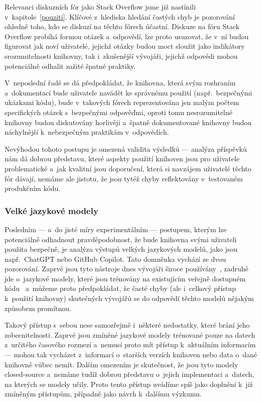 Relevanci diskuzních fór jako Stack Overflow jsme již nastínili v~kapitole~\ref{pouziti}. Klíčové z~hlediska hledání častých chyb je pozorování ohledně toho, kdo se diskuzí na těchto fórech účastní. Diskuze na fóru Stack Overflow probíhá formou otázek a~odpovědí, lze proto usuzovat, že v~ní budou figurovat jak noví uživatelé, jejichž otázky budou moct sloužit jako indikátory srozumitelnosti knihovny, tak i~zkušenější vývojáři, jejichž odpovědi mohou potenciálně odhalit zažité špatné praktiky.

V~neposlední řadě se dá předpokládat, že knihovna, která svým rozhraním a~dokumentací bude uživatele navádět ke správnému použití (např.\ bezpečnými ukázkami kódu), bude v~takových fórech reprezentována jen malým počtem specifických otázek s~bezpečnými odpověďmi, oproti tomu nesrozumitelné knihovny budou diskutovány horlivěji a~špatně dokumentované knihovny budou náchylnější k~nebezpečným praktikám v~odpovědích.

Nevýhodou tohoto postupu je omezená validita výsledků --- analýza příspěvků nám dá dobrou představu, které aspekty použití knihoven jsou pro uživatele problematické a~jak kvalitní jsou doporučení, která si navzájem uživatelé těchto fór dávají, nemáme ale jistotu, že jsou tytéž chyby reflektovány v~testovaném produkčním kódu.

\subsubsection*{Velké jazykové modely}

Posledním --- a~do jisté míry experimentálním --- postupem, kterým lze potenciálně odhadnout pravděpodobnost, že bude knihovna svými uživateli použita bezpečně, je analýza výstupů velkých jazykových modelů, jako jsou např.\ ChatGPT nebo GitHub Copilot. Tato domněnka vychází ze dvou pozorování. Zaprvé jsou tyto nástroje dnes vývojáři široce používány~\cite{ai-hallucinate, github-copilot}, zadruhé jde o~jazykové modely, které jsou trénovány na existujícím veřejně dostupném kódu~\cite{github-copilot} a~můžeme proto předpokládat, že časté chyby (ale i~celkový přístup k~použití knihovny) skutečných vývojářů se do odpovědí těchto modelů nějakým způsobem promítnou.

Takový přístup s~sebou nese samozřejmě i~některé nedostatky, které brání jeho zobecnitelnosti. Zaprvé jsou zmíněné jazykové modely trénované pouze na datech z~určitého časového rozmezí a~nemusí proto mít přístup k~aktuálním informacím --- mohou tak vycházet z~informací o~starších verzích knihoven nebo data o~dané knihovně vůbec nemít. Dalším omezením je skutečnost, že jsou tyto modely closed-source a~nemáme tudíž dobrou představu o~jejich implementaci a~datech, na kterých se modely učily. Proto tento přístup uvádíme spíš jako doplnění k~již zmíněným přístupům, případně jako návrh k~dalšímu výzkumu.

